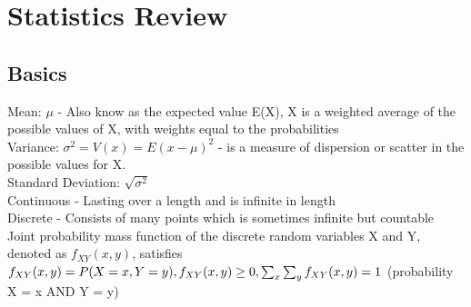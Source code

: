 \documentclass{article}
\begin{document}
\newpage
\section{Statistics Review}
\subsection{Basics}
Mean: $\mu$ - Also know as the expected value E(X), X is a weighted average of the possible values of
X, with weights equal to the probabilities \\
\vspace{1em}
Variance: $\sigma^2 = V(x) = E(x-\mu)^2$ - is a measure of dispersion or scatter in the possible
values for X. \\
\vspace{1em}
Standard Deviation: $\sqrt{\sigma^2}$ \\
\vspace{1em}
Continuous - Lasting over a length and is infinite in length \\
\vspace{1em}
Discrete - Consists of many points which is sometimes infinite but countable \\
\vspace{1em}
Joint probability mass function of the discrete random variables X and Y,
denoted as $f_{XY}(x,y)$, satisfies
$f_{XY}(x,y) = P(X=x,Y=y), \space \space f_{XY}(x,y) \geq 0, \space \space \sum_x\sum_yf_{XY}(x,y)=1$ (probability X = x AND Y = y)
\end{document}
